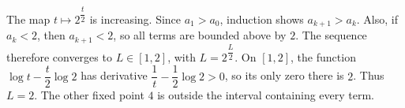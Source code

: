 The map $t \mapsto 2^{\dfrac{t}{2}}$ is increasing. Since $a_1>a_0$, induction shows $a_{k+1}>a_k$. Also, if $a_k<2$, then $a_{k+1}<2$, so all terms are bounded above by $2$. The sequence therefore converges to $L\in[1,2]$, with $L = 2^{\dfrac{L}{2}}$. On $[1,2]$, the function $\log t-\dfrac{t}{2}\log2$ has derivative $\dfrac{1}{t}-\dfrac{1}{2}\log2>0$, so its only zero there is $2$. Thus $\boxed{L=2}$. The other fixed point $4$ is outside the interval containing every term.
